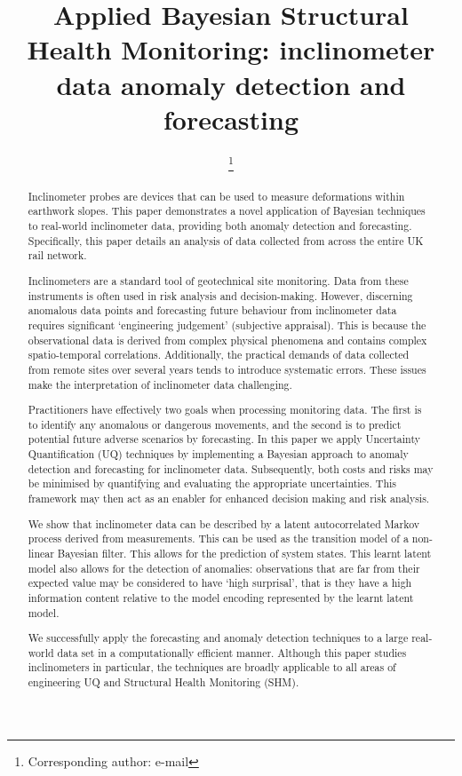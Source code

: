 \documentclass[pamm,a4paper,fleqn]{w-art}
\begin{document}
\TitleLanguage[EN]
\title[The short title]{Applied Bayesian Structural Health Monitoring: inclinometer data anomaly detection and forecasting}

\author{ %
\footnote{Corresponding author: e-mail } 
\address[\inst{1}]{\CountryCode[UK]DYWIDAG Ltd UK, Datum House, The Pavilions, Bury BL9 7NY, UK}}
\author{ }
%
\AbstractLanguage[EN]
\begin{abstract}
Inclinometer probes are devices that can be used to measure deformations within earthwork slopes. This paper demonstrates a novel application of Bayesian techniques to real-world inclinometer data, providing both anomaly detection and forecasting. Specifically, this paper details an analysis of data collected from across the entire UK rail network. 

Inclinometers are a standard tool of geotechnical site monitoring. Data from these instruments is often used in risk analysis and decision-making. However, discerning anomalous data points and forecasting future behaviour from inclinometer data requires significant `engineering judgement' (subjective appraisal). This is because the observational data is derived from complex physical phenomena and contains complex spatio-temporal correlations. Additionally, the practical demands of data collected from remote sites over several years tends to introduce systematic errors. These issues make the interpretation of inclinometer data challenging.

Practitioners have effectively two goals when processing monitoring data. The first is to identify any anomalous or dangerous movements, and the second is to predict potential future adverse scenarios by forecasting. In this paper we apply Uncertainty Quantification (UQ) techniques by implementing a Bayesian approach to anomaly detection and forecasting for inclinometer data. Subsequently, both costs and risks may be minimised by quantifying and evaluating the appropriate uncertainties. This framework may then act as an enabler for enhanced decision making and risk analysis.

We show that inclinometer data can be described by a latent autocorrelated Markov process derived from measurements. This can be used as the transition model of a non-linear Bayesian filter. This allows for the prediction of system states. This learnt latent model also allows for the detection of anomalies: observations that are far from their expected value may be considered to have `high surprisal', that is they have a high information content relative to the model encoding represented by the learnt latent model. 

We successfully apply the forecasting and anomaly detection techniques to a large real-world data set in a computationally efficient manner. Although this paper studies inclinometers in particular, the techniques are broadly applicable to all areas of engineering UQ and Structural Health Monitoring (SHM).  
\end{abstract}
\end{document}
